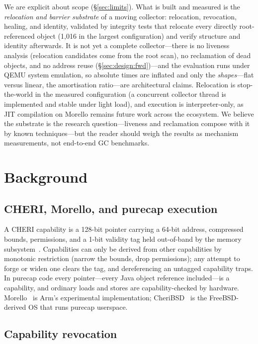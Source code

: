 \documentclass[acmsmall,nonacm,screen]{acmart}
\begin{document}
We are explicit about scope (\S\ref{sec:limits}). What is built and
measured is the \emph{relocation and barrier substrate} of a moving
collector: relocation, revocation, healing, and identity, validated by integrity tests that relocate every directly
root-referenced object (1{,}016 in the largest configuration) and
verify structure and identity afterwards. It is not yet a complete
collector---there is no liveness analysis (relocation candidates come
from the root scan), no reclamation of dead objects, and no address
reuse (\S\ref{sec:design:fwd})---and the evaluation runs under QEMU
system emulation, so absolute times are inflated and only the
\emph{shapes}---flat versus linear, the amortisation ratio---are
architectural claims. Relocation is stop-the-world in the measured
configuration (a concurrent collector thread is implemented and stable
under light load), and execution is interpreter-only, as JIT
compilation on Morello remains future work across the ecosystem. We
believe the substrate is the research question---liveness and
reclamation compose with it by known techniques---but the reader should
weigh the results as mechanism measurements, not end-to-end GC
benchmarks.

\section{Background}
\label{sec:bg}

\subsection{CHERI, Morello, and purecap execution}

A CHERI capability is a 128-bit pointer carrying a 64-bit address,
compressed bounds, permissions, and a 1-bit validity tag held
out-of-band by the memory subsystem~\cite{cheri-isa-v9}. Capabilities
can only be derived from other capabilities by monotonic restriction
(narrow the bounds, drop permissions); any attempt to forge or widen
one clears the tag, and dereferencing an untagged capability traps. In
purecap code every pointer---every Java object reference included---is
a capability, and ordinary loads and stores are capability-checked by
hardware. Morello~\cite{morello-platform} is Arm's experimental
implementation; CheriBSD~\cite{cheribsd} is the FreeBSD-derived OS that
runs purecap userspace.

\subsection{Capability revocation}
\end{document}

